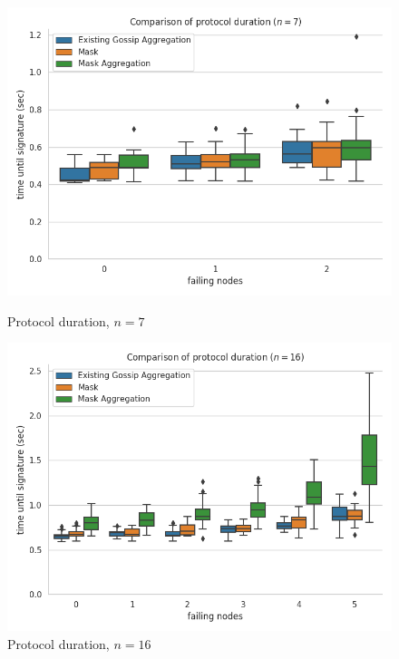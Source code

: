 \begin{figure}[H]
    \centering
    \begin{minipage}{0.5\textwidth}
        \centering
        \includegraphics[width=\textwidth]{images/aggregation_round_wall_sum_7.png}
        \captionsetup{labelformat=empty}
        \caption{Protocol duration, $n = 7$}
    \end{minipage}\hfill
    \begin{minipage}{0.5\textwidth}
        \centering
        \includegraphics[width=\textwidth]{images/aggregation_round_wall_sum_16.png}
        \captionsetup{labelformat=empty}
        \caption{Protocol duration, $n = 16$}
    \end{minipage}\hfill
\end{figure}


